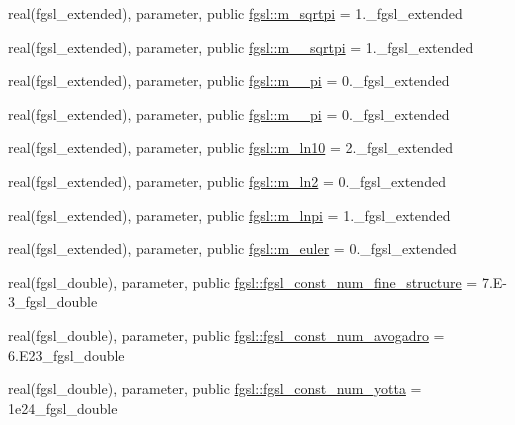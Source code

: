 \begin{DoxyCompactItemize}
\item 
real(fgsl\+\_\+extended), parameter, public \hyperlink{namespacefgsl_aa32be73a066aea0217a624284ae34c39}{fgsl\+::m\+\_\+sqrtpi} = 1.\+\_\+fgsl\+\_\+extended
\item 
real(fgsl\+\_\+extended), parameter, public \hyperlink{namespacefgsl_a20272585dc8f0b54e493f4717330469a}{fgsl\+::m\+\_\+\_\+sqrtpi} = 1.\+\_\+fgsl\+\_\+extended
\item 
real(fgsl\+\_\+extended), parameter, public \hyperlink{namespacefgsl_a10fdf50a29d35a63b13bc641ed465051}{fgsl\+::m\+\_\+\_\+pi} = 0.\+\_\+fgsl\+\_\+extended
\item 
real(fgsl\+\_\+extended), parameter, public \hyperlink{namespacefgsl_a28e530e58a51ac2bbce00674f617bbbd}{fgsl\+::m\+\_\+\_\+pi} = 0.\+\_\+fgsl\+\_\+extended
\item 
real(fgsl\+\_\+extended), parameter, public \hyperlink{namespacefgsl_a152b62af261c671c54b99ac278df759d}{fgsl\+::m\+\_\+ln10} = 2.\+\_\+fgsl\+\_\+extended
\item 
real(fgsl\+\_\+extended), parameter, public \hyperlink{namespacefgsl_a126c02aa2554290ff648243425e03ace}{fgsl\+::m\+\_\+ln2} = 0.\+\_\+fgsl\+\_\+extended
\item 
real(fgsl\+\_\+extended), parameter, public \hyperlink{namespacefgsl_ae9aff58d6fcadaab60410424796cd713}{fgsl\+::m\+\_\+lnpi} = 1.\+\_\+fgsl\+\_\+extended
\item 
real(fgsl\+\_\+extended), parameter, public \hyperlink{namespacefgsl_ab8079b9a6e17b1def176e97feda2a841}{fgsl\+::m\+\_\+euler} = 0.\+\_\+fgsl\+\_\+extended
\item 
real(fgsl\+\_\+double), parameter, public \hyperlink{namespacefgsl_aa12fc22d559b707d7e1e63ac17c596cb}{fgsl\+::fgsl\+\_\+const\+\_\+num\+\_\+fine\+\_\+structure} = 7.\+E-\/3\+\_\+fgsl\+\_\+double
\item 
real(fgsl\+\_\+double), parameter, public \hyperlink{namespacefgsl_a009cf79cdb578326cbceea51aa302e53}{fgsl\+::fgsl\+\_\+const\+\_\+num\+\_\+avogadro} = 6.\+E23\+\_\+fgsl\+\_\+double
\item 
real(fgsl\+\_\+double), parameter, public \hyperlink{namespacefgsl_a0b9812de1b4fd0e830437a0f81756409}{fgsl\+::fgsl\+\_\+const\+\_\+num\+\_\+yotta} = 1e24\+\_\+fgsl\+\_\+double
\item 

\end{DoxyCompactItemize}
